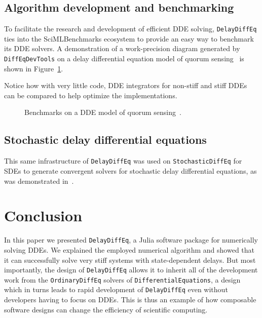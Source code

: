 \documentclass{juliacon}
\def\pkg#1{\texttt{#1}}
\begin{document}


\subsection{Algorithm development and benchmarking}

To facilitate the research and development of efficient DDE solving, \pkg{DelayDiffEq}
ties into the SciMLBenchmarks ecosystem to provide an easy way to benchmark its 
DDE solvers.
A demonstration of a work-precision diagram generated by \pkg{DiffEqDevTools}
on a delay differential equation model of quorum sensing~\cite{BuddrusSchiemann2014} is shown in Figure~\ref{fig:benchmark}.



Notice how with very
little code, DDE integrators for non-stiff and stiff DDEs can be compared to help
optimize the implementations.

\begin{figure}
    \centering
    
    \caption{Benchmarks on a DDE model of quorum sensing~\cite{BuddrusSchiemann2014}.}
    \label{fig:benchmark}
\end{figure}

\subsection{Stochastic delay differential equations}

This same infrastructure of \pkg{DelayDiffEq} was used on \pkg{StochasticDiffEq} for SDEs to generate convergent solvers for stochastic delay differential equations, as was demonstrated in~\cite{sykora2020stochasticdelaydiffeq}.

\section{Conclusion}

In this paper we presented \pkg{DelayDiffEq}, a Julia software package for numerically solving DDEs.
We explained the employed numerical algorithm and showed that it can successfully
solve very stiff systems with state-dependent delays. But most importantly, the design of \pkg{DelayDiffEq}
allows it to inherit all of the development work from the \pkg{OrdinaryDiffEq} solvers 
of \pkg{DifferentialEquations}, a design which in turns leads to rapid development of
\pkg{DelayDiffEq} even without developers having to focus on DDEs. This is thus an example of how
composable software designs can change the efficiency of scientific computing.
\end{document}
